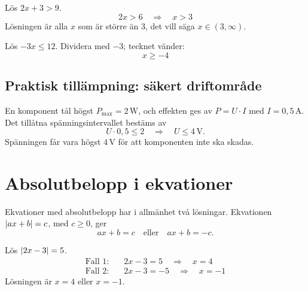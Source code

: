 \begin{exempel}
Lös $2x + 3 > 9$.
\[
  2x > 6 \quad \Rightarrow \quad x > 3
\]
Lösningen är alla $x$ som är större än $3$, det vill säga $x \in (3, \infty)$.
\end{exempel}

\begin{exempel}
Lös $-3x \leq 12$. Dividera med $-3$; tecknet vänder:
\[
  x \geq -4
\]
\end{exempel}

\subsection{Praktisk tillämpning: säkert driftområde}
\label{c3:sec:driftomrade}
En komponent tål högst $P_{\max} = 2\,\text{W}$, och effekten ges av $P = U \cdot I$ med
$I = 0{,}5\,\text{A}$. Det tillåtna spänningsintervallet bestäms av
\[
  U \cdot 0{,}5 \leq 2 \quad \Rightarrow \quad U \leq 4\,\text{V}.
\]
Spänningen får vara högst $4\,\text{V}$ för att komponenten inte ska skadas.

\section{Absolutbelopp i ekvationer}
\label{c3:sec:absolutbelopp}
Ekvationer med absolutbelopp har i allmänhet två lösningar. Ekvationen $\lvert ax + b\rvert = c$, med
$c \geq 0$, ger
\[
  ax + b = c \quad \text{eller} \quad ax + b = -c.
\]

\begin{exempel}
Lös $\lvert2x - 3\rvert = 5$.
\begin{align*}
  \text{Fall 1:} &\quad 2x - 3 = 5 \quad \Rightarrow \quad x = 4 \\
  \text{Fall 2:} &\quad 2x - 3 = -5 \quad \Rightarrow \quad x = -1
\end{align*}
Lösningen är $x = 4$ eller $x = -1$.
\end{exempel}
